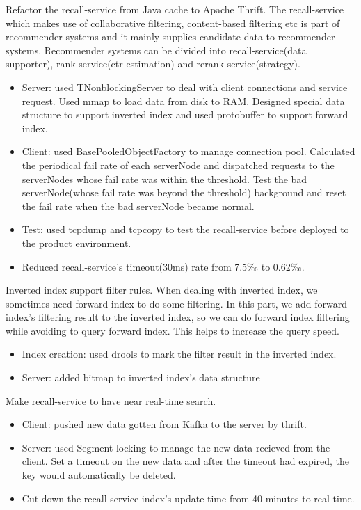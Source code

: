 \documentclass{resume}
\begin{document}
Refactor the recall-service from Java cache to Apache Thrift. The recall-service which makes use of collaborative filtering, content-based filtering etc is part of recommender systems and it mainly supplies candidate data to recommender systems. Recommender systems can be divided into recall-service(data supporter), rank-service(ctr estimation) and rerank-service(strategy).
\begin{itemize}
  \item Server: used TNonblockingServer to deal with client connections and service request. Used mmap to load data from disk to RAM. Designed special data structure to support inverted index and used protobuffer to support forward index.
  \item Client: used BasePooledObjectFactory to manage connection pool. Calculated the periodical fail rate of each serverNode and dispatched requests to the serverNodes whose fail rate was within the threshold. Test the bad serverNode(whose fail rate was beyond the threshold) background and reset the fail rate when the bad serverNode became normal.
  \item Test: used tcpdump and tcpcopy to test the recall-service before deployed to the product environment.
  \item Reduced recall-service's timeout(30ms) rate from 7.5‰ to 0.62‰.
\end{itemize}

Inverted index support filter rules. When dealing with inverted index, we sometimes need forward index to do some filtering. In this part, we add forward index's filtering result to the inverted index, so we can do forward index filtering while avoiding to query forward index. This helps to increase the query speed.
\begin{itemize}
  \item Index creation: used drools to mark the filter result in the inverted index.
  \item Server: added bitmap to inverted index's data structure
\end{itemize}

Make recall-service to have near real-time search.
\begin{itemize}
  \item Client: pushed new data gotten from Kafka to the server by thrift.
  \item Server: used Segment locking to manage the new data recieved from the client. Set a timeout on the new data and after the timeout had expired, the key would automatically be deleted.
  \item Cut down the recall-service index's update-time from 40 minutes to real-time.
\end{itemize}
\end{document}
